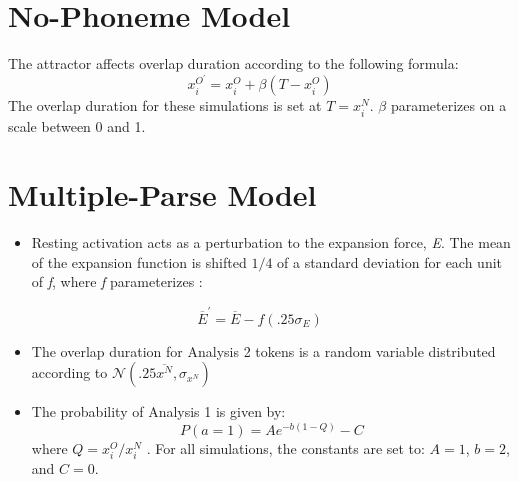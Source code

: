 \section{No-Phoneme Model}
The  attractor affects overlap duration according to the following
formula:
\begin{equation}
x_{i}^{O^{\prime}}=x_{i}^{O}+\beta(T-x_{i}^{O})\label{eq:Frequency attractor-1}
\end{equation}
The  overlap duration for these simulations is set at $T=x_{i}^{N}$.
$\beta$ parameterizes  on a scale between 0 and 1. 

\section{Multiple-Parse Model}
\begin{itemize}
\item Resting activation acts as a perturbation to the expansion force,
\emph{E}. The mean of the expansion function is shifted ${1}/{4}$
of a standard deviation for each unit of \emph{f}, where \emph{f} parameterizes
:
\end{itemize}
\[
\overline{E}^{\prime}=\overline{E}-f(.25\sigma_{E})
\]

\begin{itemize}
\item The overlap duration for Analysis 2 tokens is a random variable distributed
according to $\mathcal{\mathscr{N}}\left(.25\overline{x^{N}},\sigma_{x^{N}}\right)$
\item The probability of Analysis 1 is given by:
\begin{equation}
P(a=1)=Ae^{-b(1-Q)}-C\label{eq:segmentation-1-1}
\end{equation}
where $Q={x_{i}^{O}}/{x_{i}^{N}}$\emph{ }. For all simulations,
the constants are set to: $A=1$, $b=2$, and $C=0$.
\end{itemize}
